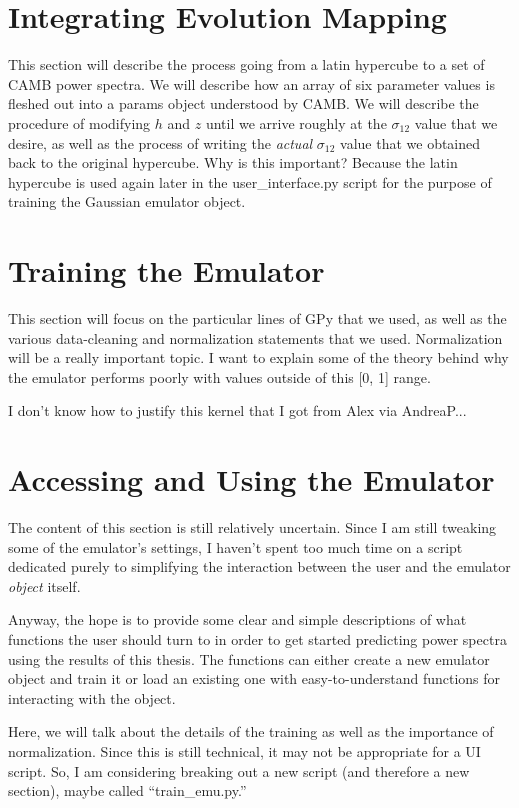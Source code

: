 \section{Integrating Evolution Mapping}


This section will describe the process going from a latin hypercube to a set of CAMB power spectra. We will describe how an array of six parameter values is fleshed out into a params object understood by CAMB. We will describe the procedure of modifying $h$ and $z$ until we arrive roughly at the $\sigma_{12}$ value that we desire, as well as the process of writing the \textit{actual} $\sigma_{12}$ value that we obtained back to the original hypercube. Why is this important? Because the latin hypercube is used again later in the user\_interface.py script for the purpose of training the Gaussian emulator object.

\section{Training the Emulator}
\label{sec: emu_training}


This section will focus on the particular lines of GPy that we used, as well
as the various data-cleaning and normalization statements that we used.
Normalization will be a really important topic. I want to explain some of
the theory behind why the emulator performs poorly with values outside of this
[0, 1] range.

I don't know how to justify this kernel that I got from Alex via AndreaP...

\section{Accessing and Using the Emulator}


The content of this section is still relatively uncertain. Since I am still tweaking some of the emulator's settings, I haven't spent too much time on a script dedicated purely to simplifying the interaction between the user and the emulator \textit{object} itself.

Anyway, the hope is to provide some clear and simple descriptions of what functions the user should turn to in order to get started predicting power spectra using the results of this thesis. The functions can either create a new emulator object and train it or load an existing one with easy-to-understand functions for interacting with the object.

Here, we will talk about the details of the training as well as the importance of normalization. Since this is still technical, it may not be appropriate for a UI script. So, I am considering breaking out a new script (and therefore a new section), maybe called ``train\_emu.py.''
